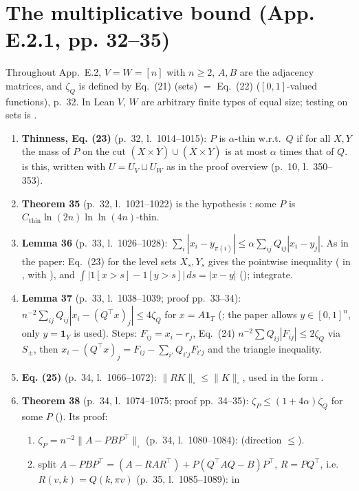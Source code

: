 \section{The multiplicative bound (App. E.2.1, pp. 32--35)}
Throughout App.~E.2, $V=W=[n]$ with $n\ge2$, $A,B$ are the adjacency matrices, and $\zeta_Q$ is defined by Eq.~(21)
(sets) $=$ Eq.~(22) ($[0,1]$-valued functions), p.~32. In Lean $V$, $W$ are arbitrary finite types of equal size;
testing on sets is .
\begin{enumerate}
\item \textbf{Thinness, Eq. (23)} (p.~32, l.~1014--1015): $P$ is $\alpha$-thin w.r.t.\ $Q$ if for all $X,Y$ the mass of $P$ on the cut
$(X\times\overline Y)\cup(\overline X\times Y)$ is at most $\alpha$ times that of $Q$.  is this, written with
$U=U_V\sqcup U_W$ as in the proof overview (p.~10, l.~350--353).
\item \textbf{Theorem 35} (p.~32, l.~1021--1022) is the hypothesis : some $P$ is
$C_{\mathrm{thin}}\ln(2n)\ln\ln(4n)$-thin.
\item \textbf{Lemma 36} (p.~33, l.~1026--1028): $\sum_i|x_i-y_{\pi(i)}|\le\alpha\sum_{ij}Q_{ij}|x_i-y_j|$. As in the paper: Eq.~(23) for the
level sets $X_s,Y_s$ gives the pointwise inequality ( in , with ), and
$\int|1[x>s]-1[y>s]|\,ds=|x-y|$ (); integrate.
\item \textbf{Lemma 37} (p.~33, l.~1038--1039; proof pp.~33--34): $n^{-2}\sum_{ij}Q_{ij}|x_i-(Q^\top x)_j|\le4\zeta_Q$ for $x=A\mathbf 1_T$
(; the paper allows $y\in[0,1]^n$, only $y=\mathbf1_Y$ is used). Steps: $F_{ij}=x_i-r_j$, Eq.~(24)
$n^{-2}\sum Q_{ij}|F_{ij}|\le2\zeta_Q$ via $S_\pm$, then $x_i-(Q^\top x)_j=F_{ij}-\sum_{i'}Q_{i'j}F_{i'j}$ and the triangle
inequality.
\item \textbf{Eq. (25)} (p.~34, l.~1066--1072): $\|RK\|_\square\le\|K\|_\square$, used in the form .
\item \textbf{Theorem 38} (p.~34, l.~1074--1075; proof pp.~34--35): $\zeta_P\le(1+4\alpha)\zeta_Q$ for some $P$ (). Its proof:
  \begin{enumerate}
  \item $\zeta_P=n^{-2}\|A-PBP^\top\|_\square$ (p.~34, l.~1080--1084):  (direction $\le$).
  \item split $A-PBP^\top=(A-RAR^\top)+P(Q^\top AQ-B)P^\top$, $R=PQ^\top$, i.e.\ $R(v,k)=Q(k,\pi v)$ (p.~35, l.~1085--1089):  in

\end{enumerate}
\end{enumerate}
